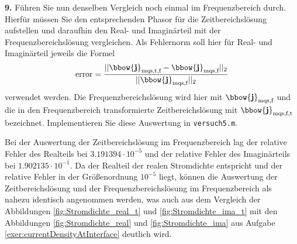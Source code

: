 \documentclass[Protokollheft.tex]{subfiles}
\begin{document}
\begin{framed}
	\noindent \textbf{9.} Führen Sie nun denselben Vergleich noch einmal im Frequenzbereich durch. Hierfür müssen Sie den entsprechenden Phasor für die Zeitbereichslösung aufstellen und daraufhin den Real- und Imaginärteil mit der Frequenzbereichslösung vergleichen. Als Fehlernorm soll hier für Real- und Imaginärteil jeweils die Formel
    \begin{equation}
        \text{error} = \frac{||\bbow{\mathbf{j}}_\text{mqs,t,f}-\bbow{\mathbf{j}}_\text{mqs,f}||_2}{||\bbow{\mathbf{j}}_\text{mqs,f}||_2}
    \end{equation}
    verwendet werden. Die Frequenzbereichslösung wird hier mit $\bbow{\mathbf{j}}_\text{mqs,f}$ und die in den Frequenzbereich transformierte Zeitbereichslösung mit $\bbow{\mathbf{j}}_\text{mqs,f,t}$ bezeichnet. Implementieren Sie diese Auswertung in \lstinline{versuch5.m}.\label{exer:compareFreqVStimeInFreq}
\end{framed}
\noindent
Bei der Auswertung der Zeitbereichslösung im Frequenzbereich lag der relative Fehler des Realteils bei $3.191394\cdot 10^{-5}$ und der relative Fehler des Imaginärteils bei $1.902135\cdot 10^{-1}$. Da der Realteil der realen Stromdichte entspricht und der relative Fehler in der Größenordnung $10^{-5}$ liegt, können die Auswertung der Zeitbereichslösung und der Frequenzbereichslösung im Frequenzbereich als nahezu identisch angenommen werden, was auch aus dem Vergleich der Abbildungen \ref{fig:Stromdichte_real_t} und \ref{fig:Stromdichte_ima_t} mit den Abbildungen \ref{fig:Stromdichte_real} und \ref{fig:Stromdichte_ima} aus Aufgabe \ref{exer:currentDensityAtInterface} deutlich wird.
\end{document}
